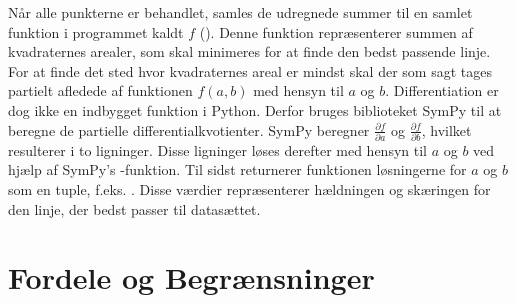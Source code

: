 Når alle punkterne er behandlet, samles de udregnede summer til en samlet funktion i programmet kaldt $f$ (). Denne funktion repræsenterer summen af kvadraternes arealer, som skal minimeres for at finde den bedst passende linje. For at finde det sted hvor kvadraternes areal er mindst skal der som sagt tages partielt afledede af funktionen $f(a,b)$ med hensyn til $a$ og $b$. Differentiation er dog ikke en indbygget funktion i Python. Derfor bruges biblioteket SymPy til at beregne de partielle differentialkvotienter. SymPy beregner $\frac{\partial f}{\partial a}$ og $\frac{\partial f}{\partial b}$, hvilket resulterer i to ligninger. Disse ligninger løses derefter med hensyn til $a$ og $b$ ved hjælp af SymPy's -funktion. Til sidst returnerer funktionen løsningerne for $a$ og $b$ som en tuple, f.eks. \pythoninline{[a, b]}. Disse værdier repræsenterer hældningen og skæringen for den linje, der bedst passer til datasættet.

\section{Fordele og Begrænsninger}\label{sec:fordeleOgBegrensninger}


